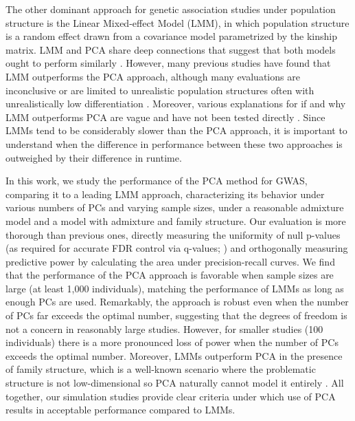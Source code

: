 \documentclass[11pt]{article}
\begin{document}
The other dominant approach for genetic association studies under population structure is the Linear Mixed-effect Model (LMM), in which population structure is a random effect drawn from a covariance model parametrized by the kinship matrix.
LMM and PCA share deep connections that suggest that both models ought to perform similarly \citep{hoffman_correcting_2013}.
However, many previous studies have found that LMM outperforms the PCA approach, although many evaluations are inconclusive or are limited to unrealistic population structures often with unrealistically low differentiation \citep{astle_population_2009, kang_variance_2010, price_new_2010, wang_analytical_2013}.
Moreover, various explanations for if and why LMM outperforms PCA are vague and have not been tested directly \citep{price_new_2010, sul_mixed_2013, price_response_2013}.
Since LMMs tend to be considerably slower than the PCA approach, it is important to understand when the difference in performance between these two approaches is outweighed by their difference in runtime.

In this work, we study the performance of the PCA method for GWAS, comparing it to a leading LMM approach, characterizing its behavior under various numbers of PCs and varying sample sizes, under a reasonable admixture model and a model with admixture and family structure.
Our evaluation is more thorough than previous ones, directly measuring the uniformity of null p-values (as required for accurate FDR control via q-values; \cite{storey_positive_2003, storey_statistical_2003}) and orthogonally measuring predictive power by calculating the area under precision-recall curves.
We find that the performance of the PCA approach is favorable when sample sizes are large (at least 1,000 individuals), matching the performance of LMMs as long as enough PCs are used.
Remarkably, the approach is robust even when the number of PCs far exceeds the optimal number, suggesting that the degrees of freedom is not a concern in reasonably large studies.
However, for smaller studies (100 individuals) there is a more pronounced loss of power when the number of PCs exceeds the optimal number.
Moreover, LMMs outperform PCA in the presence of family structure, which is a well-known scenario where the problematic structure is not low-dimensional so PCA naturally cannot model it entirely \citep{patterson_population_2006, price_new_2010}.
All together, our simulation studies provide clear criteria under which use of PCA results in acceptable performance compared to LMMs.
\end{document}
